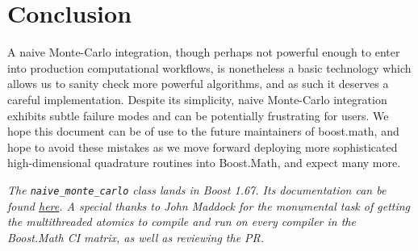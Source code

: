 \documentclass{ansarticle}
\begin{document}
\section{Conclusion}

A naive Monte-Carlo integration, though perhaps not powerful enough to enter into production computational workflows, is nonetheless a basic technology which allows us to sanity check more powerful algorithms, and as such it deserves a careful implementation.
Despite its simplicity, naive Monte-Carlo integration exhibits subtle failure modes and can be potentially frustrating for users.
We hope this document can be of use to the future maintainers of boost.math, and hope to avoid these mistakes as we move forward deploying more sophisticated high-dimensional quadrature routines into Boost.Math, and expect many more.



\emph{The \texttt{naive_monte_carlo} class lands in Boost 1.67. Its documentation can be found \href{http://www.boost.org/doc/libs/1_67_0/libs/math/doc/html/quadrature.html}{here}. A special thanks to John Maddock for the monumental task of getting the multithreaded atomics to compile and run on every compiler in the Boost.Math CI matrix, as well as reviewing the PR.}



\end{document}
